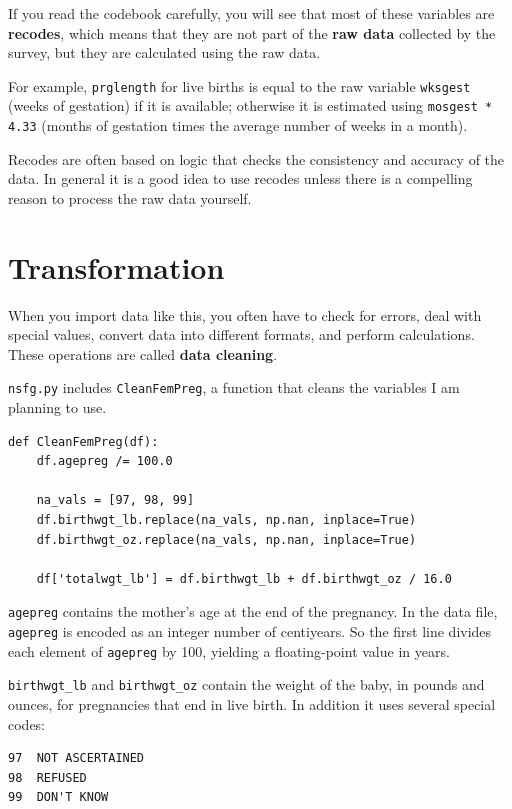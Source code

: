 \documentclass[12pt]{book}
\begin{document}
If you read the codebook carefully, you will see that most of these
variables are {\bf recodes}, which means that they are not part of the
{\bf raw data} collected by the survey, but they are calculated using
the raw data.   

For example, {\tt prglength} for live births is equal to the raw
variable {\tt wksgest} (weeks of gestation) if it is available;
otherwise it is estimated using {\tt mosgest * 4.33} (months of
gestation times the average number of weeks in a month).

Recodes are often based on logic that checks the consistency and
accuracy of the data.  In general it is a good idea to use recodes
unless there is a compelling reason to process the raw data
yourself.


\section{Transformation}

When you import data like this, you often have to check for errors,
deal with special values, convert data into different formats, and
perform calculations.  These operations are called {\bf data cleaning}.

{\tt nsfg.py} includes {\tt CleanFemPreg}, a function that cleans
the variables I am planning to use.

\begin{verbatim}
def CleanFemPreg(df):
    df.agepreg /= 100.0

    na_vals = [97, 98, 99]
    df.birthwgt_lb.replace(na_vals, np.nan, inplace=True)
    df.birthwgt_oz.replace(na_vals, np.nan, inplace=True)

    df['totalwgt_lb'] = df.birthwgt_lb + df.birthwgt_oz / 16.0    
\end{verbatim}

{\tt agepreg} contains the mother's age at the end of the
pregnancy.  In the data file, {\tt agepreg} is encoded as an integer
number of centiyears.  So the first line divides each element
of {\tt agepreg} by 100, yielding a floating-point value in
years.

\verb"birthwgt_lb" and \verb"birthwgt_oz" contain the weight of the
baby, in pounds and ounces, for pregnancies that end in live birth.
In addition it uses several special codes:

\begin{verbatim}
97	NOT ASCERTAINED
98	REFUSED	 
99	DON'T KNOW
\end{verbatim}
\end{document}
